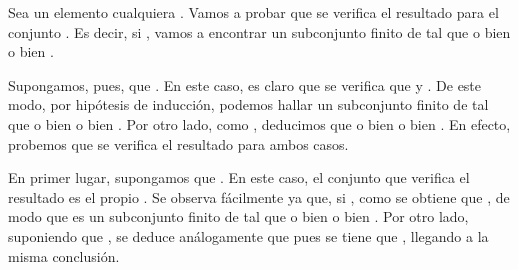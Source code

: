 \begin{isabellebody}
\begin{isamarkuptext}
\begin{demostracion}
    Sea un elemento cualquiera . Vamos a probar que se verifica el resultado para el conjunto
    . Es decir, si , vamos a encontrar un subconjunto finito  de 
     tal que o bien  o bien .

    Supongamos, pues, que . En este caso, es claro que se verifica que
     y . De este modo, por hipótesis de inducción, podemos hallar un
    subconjunto finito  de  tal que o bien  o bien . Por otro lado,
    como , deducimos que o bien  o bien . En efecto, 
    probemos que se verifica el resultado para ambos casos.

    En primer lugar, supongamos que . En este caso, el conjunto  que verifica el
    resultado es el propio . Se observa fácilmente ya que, si , como 
    se obtiene que , de modo que  es un subconjunto finito de 
    tal que o bien  o bien . Por otro lado, suponiendo que 
    , se deduce análogamente que  pues se tiene que , llegando
    a la misma conclusión.


\end{demostracion}
\end{isamarkuptext}
\end{isabellebody}
